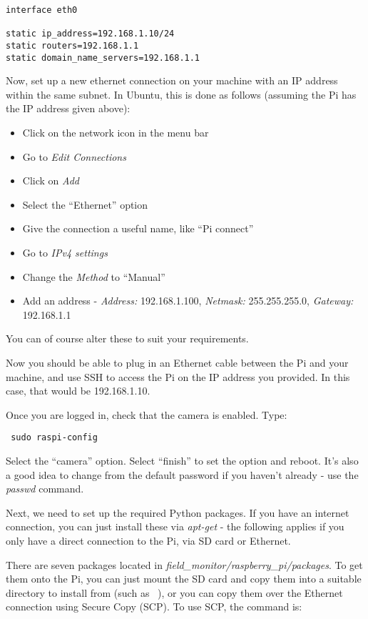 \documentclass[10pt]{article}
\begin{document}
\begin{verbatim}
interface eth0

static ip_address=192.168.1.10/24
static routers=192.168.1.1
static domain_name_servers=192.168.1.1
\end{verbatim}

Now, set up a new ethernet connection on your machine with an IP address within the same subnet. In Ubuntu, this is done as follows (assuming the Pi has the IP address
given above):

\begin{itemize}
 \item Click on the network icon in the menu bar
 \item Go to \textit{Edit Connections}
 \item Click on \textit{Add}
 \item Select the ``Ethernet'' option
 \item Give the connection a useful name, like ``Pi connect''
 \item Go to \textit{IPv4 settings}
 \item Change the \textit{Method} to ``Manual''
 \item Add an address - \textit{Address:} 192.168.1.100, \textit{Netmask:} 255.255.255.0, \textit{Gateway:} 192.168.1.1
\end{itemize}

You can of course alter these to suit your requirements.

Now you should be able to plug in an Ethernet cable between the Pi and your machine, and use SSH to access the Pi on the IP address you provided. In this case, that 
would be 192.168.1.10.

Once you are logged in, check that the camera is enabled. Type:

\begin{verbatim}
 sudo raspi-config
\end{verbatim}

Select the ``camera'' option. Select ``finish'' to set the option and reboot. It's also a good idea to change from the default password if you haven't already - 
use the \textit{passwd} command. 

Next, we need to set up the required Python packages. If you have an internet connection, you can just install these via \textit{apt-get} - the following applies if 
you only have a direct connection to the Pi, via SD card or Ethernet.

There are seven packages located in \textit{field\_monitor/raspberry\_pi/packages}. To get them onto the Pi, you can just mount the SD card
and copy them into a suitable directory to install from (such as ~), or you can copy them over the Ethernet connection using Secure Copy (SCP). To use SCP, the 
command is:
\end{document}
